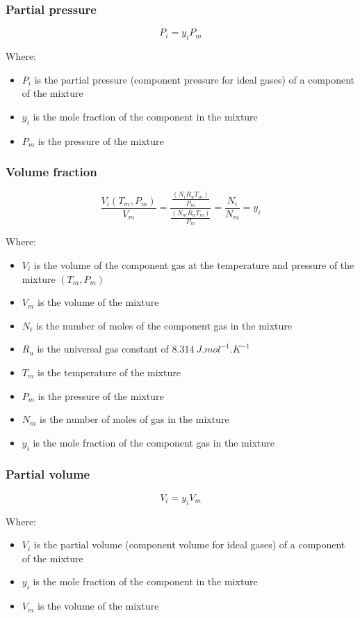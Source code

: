 \documentclass[11pt]{article}
\begin{document}
\subsubsection{Partial pressure}
\label{sec:org7c01291}
\[P_i = y_i P_m\]

Where:
\begin{itemize}
\item \(P_i\) is the partial pressure (component pressure for ideal gases) of a component of the mixture
\item \(y_i\) is the mole fraction of the component in the mixture
\item \(P_m\) is the pressure of the mixture
\end{itemize}
\subsubsection{Volume fraction}
\label{sec:orgb5b6810}
\[\frac{V_i(T_m, P_m)}{V_m} = \frac{\frac{(N_i R_u T_m)}{P_m}}{\frac{(N_m R_u T_m)}{P_m}} = \frac{N_i}{N_m} = y_i\]

Where:
\begin{itemize}
\item \(V_i\) is the volume of the component gas at the temperature and pressure of the mixture \((T_m, P_m)\)
\item \(V_m\) is the volume of the mixture
\item \(N_i\) is the number of moles of the component gas in the mixture
\item \(R_u\) is the universal gas constant of \(\qty{8.314}{J.mol^{-1}.K^{-1}}\)
\item \(T_m\) is the temperature of the mixture
\item \(P_m\) is the pressure of the mixture
\item \(N_m\) is the number of moles of gas in the mixture
\item \(y_i\) is the mole fraction of the component gas in the mixture
\end{itemize}
\subsubsection{Partial volume}
\label{sec:org546aa24}
\[V_i = y_i V_m\]

Where:
\begin{itemize}
\item \(V_i\) is the partial volume (component volume for ideal gases) of a component of the mixture
\item \(y_i\) is the mole fraction of the component in the mixture
\item \(V_m\) is the volume of the mixture
\end{itemize}
\end{document}
